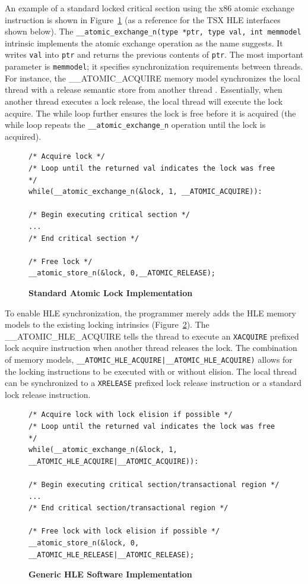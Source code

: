 \documentclass[11pt]{book}
\begin{document}
An example of a standard locked critical section using the x86 atomic exchange instruction
is shown in Figure~\ref{fig:lock_interface} (as a reference for the TSX HLE interfaces
shown below).  The \texttt{\_\_atomic\_exchange\_n(type *ptr, type val, int memmodel}
intrinsic implements the atomic exchange operation as the name suggests.  It writes
\texttt{val} into \texttt{ptr} and returns the previous contents of \texttt{ptr}.  The
most important parameter is \texttt{memmodel}; it specifies synchronization requirements
between threads.  For instance, the \_\_ATOMIC\_ACQUIRE memory model synchronizes the
local thread with a release semantic store from another thread \cite{gcc}.  Essentially,
when another thread executes a lock release, the local thread will execute the lock
acquire.  The while loop further ensures the lock is free before it is acquired (the
while loop repeats the \texttt{\_\_atomic\_exchange\_n} operation until the lock is
acquired). 

\begin{figure}
\begin{verbatim}
/* Acquire lock */
/* Loop until the returned val indicates the lock was free */
while(__atomic_exchange_n(&lock, 1, __ATOMIC_ACQUIRE)):

/* Begin executing critical section */
...
/* End critical section */

/* Free lock */
__atomic_store_n(&lock, 0,__ATOMIC_RELEASE);
\end{verbatim}
    \caption{\textbf{Standard Atomic Lock Implementation}}\label{fig:lock_interface} 
\end{figure}

To enable HLE synchronization, the programmer merely adds the HLE memory models to the
existing locking intrinsics (Figure~\ref{fig:hle_interface}).  The
\_\_ATOMIC\_HLE\_ACQUIRE tells the thread to execute an \texttt{XACQUIRE} prefixed lock
acquire instruction when another thread releases the lock.  The combination of memory
models, \texttt{\_\_ATOMIC\_HLE\_ACQUIRE|\_\_ATOMIC\_HLE\_ACQUIRE)} allows for the locking
instructions to be executed with or without elision.  The local thread can be synchronized
to a \texttt{XRELEASE} prefixed lock release instruction or a standard lock release
instruction.

\begin{figure}
\begin{verbatim}
/* Acquire lock with lock elision if possible */
/* Loop until the returned val indicates the lock was free */
while(__atomic_exchange_n(&lock, 1, __ATOMIC_HLE_ACQUIRE|__ATOMIC_ACQUIRE)):

/* Begin executing critical section/transactional region */
...
/* End critical section/transactional region */

/* Free lock with lock elision if possible */
__atomic_store_n(&lock, 0, __ATOMIC_HLE_RELEASE|__ATOMIC_RELEASE);
\end{verbatim}
    \caption{\textbf{Generic HLE Software Implementation}}\label{fig:hle_interface}
\end{figure}
\end{document}
